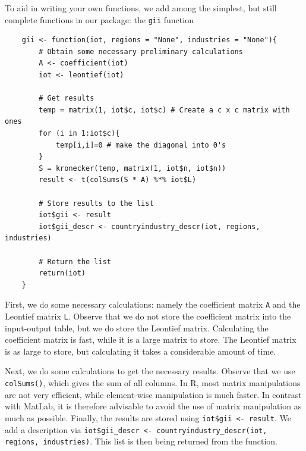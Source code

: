 \documentclass[10pt,a4paper]{paper}
\begin{document}
	To aid in writing your own functions, we add among the simplest, but still complete functions in our package: the \texttt{gii} function
	\begin{Verbatim}
	gii <- function(iot, regions = "None", industries = "None"){
		# Obtain some necessary preliminary calculations
		A <- coefficient(iot)
		iot <- leontief(iot)
	
		# Get results
		temp = matrix(1, iot$c, iot$c) # Create a c x c matrix with ones
		for (i in 1:iot$c){
			temp[i,i]=0 # make the diagonal into 0's
		}
		S = kronecker(temp, matrix(1, iot$n, iot$n)) 
		result <- t(colSums(S * A) %*% iot$L) 
		
		# Store results to the list
		iot$gii <- result	
		iot$gii_descr <- countryindustry_descr(iot, regions, industries)
		
		# Return the list
		return(iot)
	}	
	\end{Verbatim}
	First, we do some necessary calculations: namely the coefficient matrix \texttt{A} and the Leontief matrix \texttt{L}. Observe that we do not store the coefficient matrix into the input-output table, but we do store the Leontief matrix. Calculating the coefficient matrix is fast, while it is a large matrix to store. The Leontief matrix is as large to store, but calculating it takes a considerable amount of time.
	
	Next, we do some calculations to get the necessary results. Observe that we use \texttt{colSums()}, which gives the sum of all columns. In R, most matrix manipulations are not very efficient, while element-wise manipulation is much faster. In contrast with MatLab, it is therefore advisable to avoid the use of matrix manipulation as much as possible. Finally, the results are stored using \texttt{iot\$gii <- result}. We add a description via \texttt{iot\$gii\_descr <- countryindustry\_descr(iot, regions, industries)}. This list is then being returned from the function.
	
\end{document}
